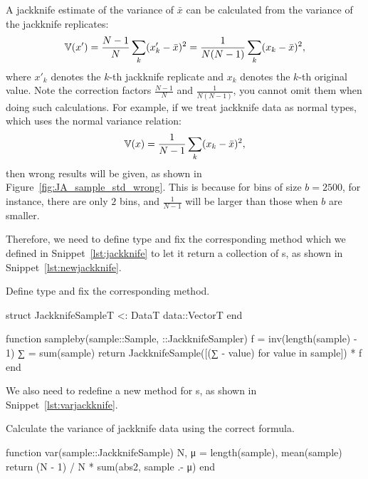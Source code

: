 A jackknife estimate of the variance of \(\bar{x}\) can be calculated from the variance of
the jackknife replicates:
%
\begin{equation}\label{eq:JAstd}
    \mathbb{V}(x') = \frac{ N - 1 }{ N } \sum_k (x_k' - \bar{x})^2
    = \frac{ 1 }{ N (N - 1) } \sum_k (x_k - \bar{x})^2,
\end{equation}
%
where \(x'_k\) denotes the \(k\)-th jackknife replicate and \(x_k\) denotes the \(k\)-th
original value.
Note the correction factors \(\frac{ N - 1 }{ N }\) and \(\frac{ 1 }{ N (N - 1) }\),
you cannot omit them when doing such calculations. For example, if we treat
jackknife data as normal  types, which uses the normal variance relation:
%
\begin{equation}
    \mathbb{V}(x) = \frac{ 1 }{ N - 1 } \sum_k (x_k - \bar{x})^2,
\end{equation}
%
then wrong results will be given, as shown in Figure~\ref{fig:JA_sample_std_wrong}.
This is because for bins of size \(b=2500\), for instance, there are only \(2\)
bins, and \(\frac{ 1 }{ N - 1 }\) will be larger than those when \(b\) are smaller.

Therefore, we need to define type  and fix the corresponding
 method which we defined in Snippet~\ref{lst:jackknife} to let it return
a collection of s,
as shown in Snippet~\ref{lst:newjackknife}.
%
\begin{algorithm}
    \caption{Define type  and fix the corresponding
         method.}
    \label{lst:newjackknife}
    \begin{juliacode}
        struct JackknifeSample{T} <: Data{T}
            data::Vector{T}
        end

        function sampleby(sample::Sample, ::JackknifeSampler)
            f = inv(length(sample) - 1)
            ∑ = sum(sample)
            return JackknifeSample([(∑ - value) for value in sample]) * f
        end
    \end{juliacode}
\end{algorithm}
%
We also need to redefine a new  method for s,
as shown in Snippet~\ref{lst:varjackknife}.
%
\begin{algorithm}
    \caption{Calculate the variance of jackknife data using the correct formula.}
    \label{lst:varjackknife}
    \begin{juliacode}
        function var(sample::JackknifeSample)
            N, μ = length(sample), mean(sample)
            return (N - 1) / N * sum(abs2, sample .- μ)
        end
    \end{juliacode}
\end{algorithm}

